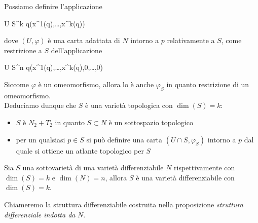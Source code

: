 Possiamo definire l'applicazione

	{U \cap S}{\R^{k}}
	{q}{(x^{1}(q),\dots,x^{k}(q))}

dove $ (U,\varphi) $ è una carta adattata di $ N $ intorno a $ p $ relativamente a $ S $, come restrizione a $ S $ dell'applicazione

	{U \cap S}{\R^{n}}
	{q}{(x^{1}(q),\dots,x^{k}(q),0,\dots,0)}

Siccome $ \varphi $ è un omeomorfismo, allora lo è anche $ \varphi_{S} $ in quanto restrizione di un omeomorfismo. \\
Deduciamo dunque che $ S $ è una varietà topologica con $ \dim(S) = k $:

\begin{itemize}
	\item $ S $ è $ N_{2}+T_{2} $ in quanto $ S \subset N $ è un sottospazio topologico
	
	\item per un qualsiasi $ p \in S $ si può definire una carta $ (U \cap S,\varphi_{S}) $ intorno a $ p $ dal quale si ottiene un atlante topologico per $ S $
\end{itemize}

\begin{definition}
	Sia $ S $ una sottovarietà di una varietà differenziabile $ N $ rispettivamente con $ \dim(S) = k $ e $ \dim(N) = n $, allora $ S $ è una varietà differenziabile con $ \dim(S) = k $.
\end{definition}

Chiameremo la struttura differenziabile costruita nella proposizione \textit{struttura differenziale indotta da} $ N $.

